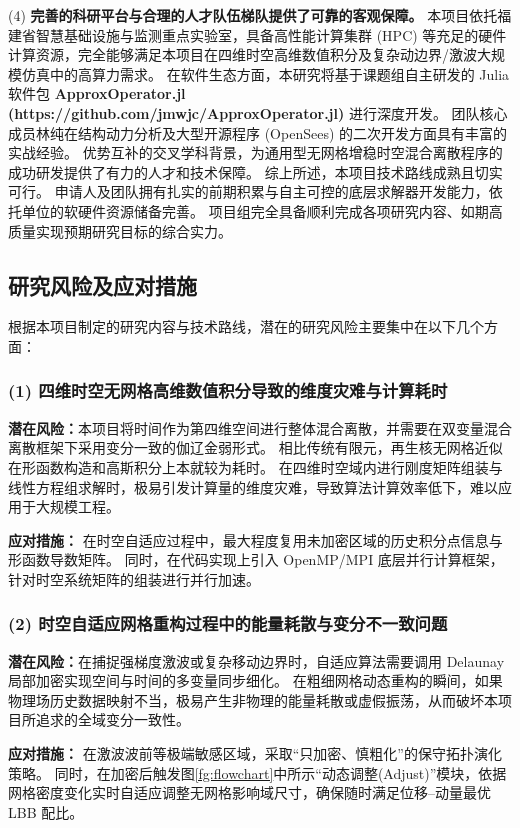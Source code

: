 (4) \textbf{完善的科研平台与合理的人才队伍梯队提供了可靠的客观保障。}
本项目依托福建省智慧基础设施与监测重点实验室，具备高性能计算集群 (HPC) 等充足的硬件计算资源，完全能够满足本项目在四维时空高维数值积分及复杂动边界/激波大规模仿真中的高算力需求。
在软件生态方面，本研究将基于课题组自主研发的 Julia 软件包 \textbf{ApproxOperator.jl (https://github.com/jmwjc/ApproxOperator.jl)} 进行深度开发。
团队核心成员林纯在结构动力分析及大型开源程序 (OpenSees) 的二次开发方面具有丰富的实战经验。
优势互补的交叉学科背景，为通用型无网格增稳时空混合离散程序的成功研发提供了有力的人才和技术保障。
\newpage 
综上所述，本项目技术路线成熟且切实可行。
申请人及团队拥有扎实的前期积累与自主可控的底层求解器开发能力，依托单位的软硬件资源储备完善。
项目组完全具备顺利完成各项研究内容、如期高质量实现预期研究目标的综合实力。

\subsection{\bfseries 研究风险及应对措施}

根据本项目制定的研究内容与技术路线，潜在的研究风险主要集中在以下几个方面：

\subsubsection*{\bfseries (1) 四维时空无网格高维数值积分导致的维度灾难与计算耗时}

\textbf{潜在风险：}本项目将时间作为第四维空间进行整体混合离散，并需要在双变量混合离散框架下采用变分一致的伽辽金弱形式。
相比传统有限元，再生核无网格近似在形函数构造和高斯积分上本就较为耗时。
在四维时空域内进行刚度矩阵组装与线性方程组求解时，极易引发计算量的维度灾难，导致算法计算效率低下，难以应用于大规模工程。

\textbf{应对措施：}
在时空自适应过程中，最大程度复用未加密区域的历史积分点信息与形函数导数矩阵。
同时，在代码实现上引入 OpenMP/MPI 底层并行计算框架，针对时空系统矩阵的组装进行并行加速。
\newpage

\subsubsection*{\bfseries (2) 时空自适应网格重构过程中的能量耗散与变分不一致问题}

\textbf{潜在风险：}在捕捉强梯度激波或复杂移动边界时，自适应算法需要调用 Delaunay 局部加密实现空间与时间的多变量同步细化。
在粗细网格动态重构的瞬间，如果物理场历史数据映射不当，极易产生非物理的能量耗散或虚假振荡，从而破坏本项目所追求的全域变分一致性。

\textbf{应对措施：}
在激波波前等极端敏感区域，采取“只加密、慎粗化”的保守拓扑演化策略。
同时，在加密后触发图\ref{fg:flowchart}中所示“动态调整(Adjust)”模块，依据网格密度变化实时自适应调整无网格影响域尺寸，确保随时满足位移--动量最优 LBB 配比。
